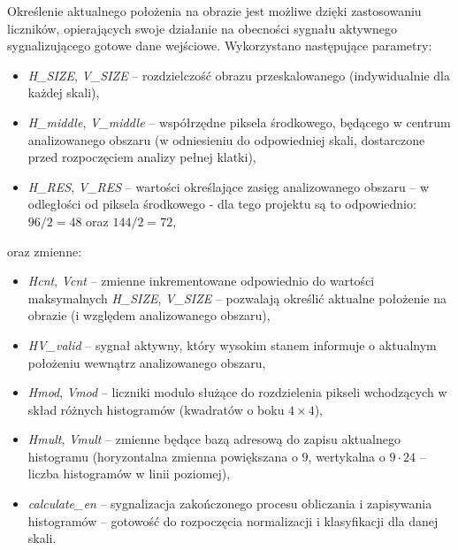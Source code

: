 Określenie aktualnego położenia na obrazie jest możliwe dzięki zastosowaniu liczników, opierających swoje działanie na obecności sygnału aktywnego sygnalizującego gotowe dane wejściowe.
Wykorzystano następujące parametry:
\begin{itemize}
	\item \textit{H\_SIZE}, \textit{V\_SIZE} -- rozdzielczość obrazu przeskalowanego (indywidualnie dla każdej skali),
	\item \textit{H\_middle}, \textit{V\_middle} -- współrzędne piksela środkowego, będącego w centrum analizowanego obszaru (w odniesieniu do odpowiedniej skali, dostarczone przed rozpoczęciem analizy pełnej klatki),
	\item \textit{H\_RES}, \textit{V\_RES} -- wartości określające zasięg analizowanego obszaru -- w odległości od piksela środkowego - dla tego projektu są to odpowiednio: $96/2=48$ oraz $144/2=72$,
\end{itemize}
oraz zmienne:
\begin{itemize}
	\item \textit{Hcnt}, \textit{Vcnt} -- zmienne inkrementowane odpowiednio do wartości maksymalnych \textit{H\_SIZE}, \textit{V\_SIZE} -- pozwalają określić aktualne położenie na obrazie (i względem analizowanego obszaru),
	\item \textit{HV\_valid} -- sygnał aktywny, który wysokim stanem informuje o aktualnym położeniu wewnątrz analizowanego obszaru,
	\item \textit{Hmod}, \textit{Vmod} -- liczniki modulo służące do rozdzielenia pikseli wchodzących w skład różnych histogramów (kwadratów o boku $4\times 4$),
	\item \textit{Hmult}, \textit{Vmult} -- zmienne będące bazą adresową do zapisu aktualnego histogramu (horyzontalna zmienna powiększana o $9$, wertykalna o $9\cdot24$ -- liczba histogramów w linii poziomej),
	\item \textit{calculate\_en} -- sygnalizacja zakończonego procesu obliczania i zapisywania histogramów -- gotowość do rozpoczęcia normalizacji i klasyfikacji dla danej skali. 
\end{itemize}

